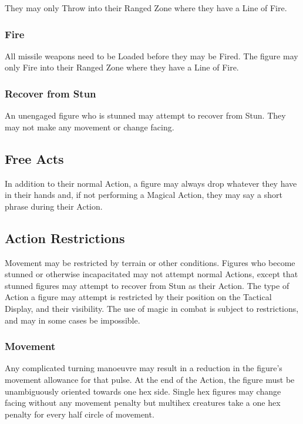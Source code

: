 \begin{multicols*}{3}
They may only Throw into their Ranged Zone where they have a Line of
Fire.

\subsubsection{Fire}

All missile weapons need to be Loaded before they may be Fired. The
figure may only Fire into their Ranged Zone where they have a Line of
Fire.

\subsubsection{Recover from Stun}

An unengaged figure who is stunned may attempt to recover from Stun.
They may not make any movement or change facing.

\subsection{Free Acts}
\label{combat:free}

In addition to their normal Action, a figure may always drop whatever
they have in their hands and, if not performing a Magical Action, they
may say a short phrase during their Action.

\subsection{Action Restrictions}
\label{combat:restrictions}
Movement may be restricted by terrain or other conditions.  Figures
who become stunned or otherwise incapacitated may not attempt normal
Actions, except that stunned figures may attempt to recover from Stun
as their Action.  The type of Action a figure may attempt is
restricted by their position on the Tactical Display, and their
visibility. The use of magic in combat is subject to restrictions, and
may in some cases be impossible.

\subsubsection{Movement}

Any complicated turning manoeuvre may result in a reduction in the
figure's movement allowance for that pulse.  At the end of the Action,
the figure must be unambiguously oriented towards one hex side.  Single
hex figures may change facing without any movement penalty but multihex
creatures take a one hex penalty for every half circle of movement.


\end{multicols*}
